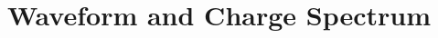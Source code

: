 \documentclass[11pt,compress,xcolor=x11names,UTF8]{beamer}
\begin{document}
\section{Waveform and Charge Spectrum}
%
\end{document}
